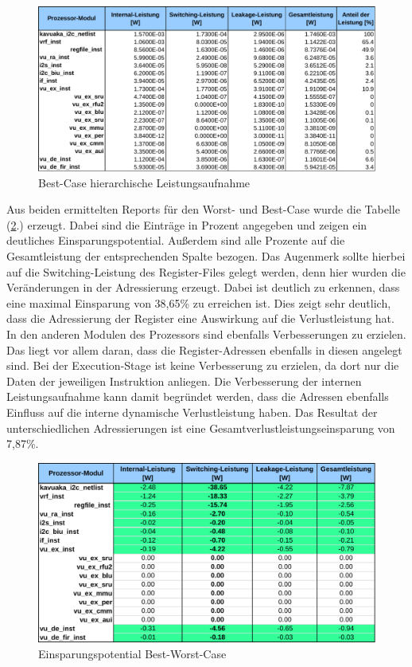 \begin{figure}[H] 
	\centering
	\includegraphics[width=\textwidth]{fig/best_hierarchy_report.pdf}
	\caption{Best-Case hierarchische Leistungsaufnahme}
	\label{fig:best_power_hierarchy}
\end{figure}

Aus beiden ermittelten Reports für den Worst- und Best-Case wurde die Tabelle (\ref{fig:best_powersave}.) erzeugt. Dabei sind die Einträge in Prozent angegeben und zeigen ein deutliches Einsparungspotential. Außerdem sind alle Prozente auf die Gesamtleistung der entsprechenden Spalte bezogen. Das Augenmerk sollte hierbei auf die Switching-Leistung des Register-Files gelegt werden, denn hier wurden die Veränderungen in der Adressierung erzeugt. Dabei ist deutlich zu erkennen, dass eine maximal Einsparung von 38,65\% zu erreichen ist. Dies zeigt sehr deutlich, dass die Adressierung der Register eine Auswirkung auf die Verlustleistung hat. In den anderen Modulen des Prozessors sind ebenfalls Verbesserungen zu erzielen. Das liegt vor allem daran, dass die Register-Adressen ebenfalls in diesen angelegt sind. Bei der Execution-Stage ist keine Verbesserung zu erzielen, da dort nur die Daten der jeweiligen Instruktion anliegen. Die Verbesserung der internen Leistungsaufnahme kann damit begründet werden, dass die Adressen ebenfalls Einfluss auf die interne dynamische Verlustleistung haben.
Das Resultat der unterschiedlichen Adressierungen ist eine Gesamtverlustleistungseinsparung von 7,87\%.

\begin{figure}[H] 
	\centering
	\includegraphics[width=\textwidth]{fig/best_worst_compare.pdf}
	\caption{Einsparungspotential Best-Worst-Case}
	\label{fig:best_powersave}
\end{figure}
